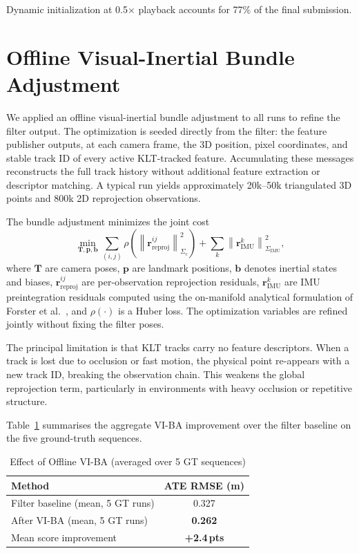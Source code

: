 \documentclass[journal]{IEEEtran}
\begin{document}
Dynamic initialization at 0.5$\times$ playback accounts for 77\% of the
final submission.


\section{Offline Visual-Inertial Bundle Adjustment}

We applied an offline visual-inertial bundle adjustment to all runs to
refine the filter output.
The optimization is seeded directly from the filter: the feature publisher
outputs, at each camera frame, the 3D position, pixel coordinates, and
stable track ID of every active KLT-tracked feature.
Accumulating these messages reconstructs the full track history without
additional feature extraction or descriptor matching.
A typical run yields approximately 20k--50k triangulated 3D points and
800k 2D reprojection observations.

The bundle adjustment minimizes the joint cost
\begin{equation}
\min_{\mathbf{T},\mathbf{p},\mathbf{b}}
\sum_{(i,j)} \rho\!\left(\left\|\mathbf{r}^{ij}_{\mathrm{reproj}}\right\|^2_{\Sigma_c}\right)
+ \sum_k \left\|\mathbf{r}^{k}_{\mathrm{IMU}}\right\|^2_{\Sigma_{\mathrm{IMU}}},
\label{eq:viba}
\end{equation}
where $\mathbf{T}$ are camera poses, $\mathbf{p}$ are landmark positions,
$\mathbf{b}$ denotes inertial states and biases,
$\mathbf{r}^{ij}_{\mathrm{reproj}}$ are per-observation reprojection
residuals, $\mathbf{r}^{k}_{\mathrm{IMU}}$ are IMU preintegration residuals
computed using the on-manifold analytical formulation of Forster et
al.~\cite{forster2017preintegration}, and $\rho(\cdot)$ is a Huber loss.
The optimization variables are refined jointly without fixing the filter
poses.

The principal limitation is that KLT tracks carry no feature descriptors.
When a track is lost due to occlusion or fast motion, the physical point
re-appears with a new track ID, breaking the observation chain.
This weakens the global reprojection term, particularly in environments with
heavy occlusion or repetitive structure.

Table~\ref{tab:viba_result} summarises the aggregate VI-BA improvement
over the filter baseline on the five ground-truth sequences.

\begin{table}[!t]
\renewcommand{\arraystretch}{1.2}
\caption{Effect of Offline VI-BA (averaged over 5 GT sequences)}
\label{tab:viba_result}
\centering
\begin{tabular}{l c}
\hline
Method & ATE RMSE (m) \\
\hline
Filter baseline (mean, 5 GT runs) & 0.327 \\
After VI-BA (mean, 5 GT runs) & \textbf{0.262} \\
Mean score improvement & \textbf{+2.4\,pts} \\
\hline
\end{tabular}
\end{table}
\end{document}
